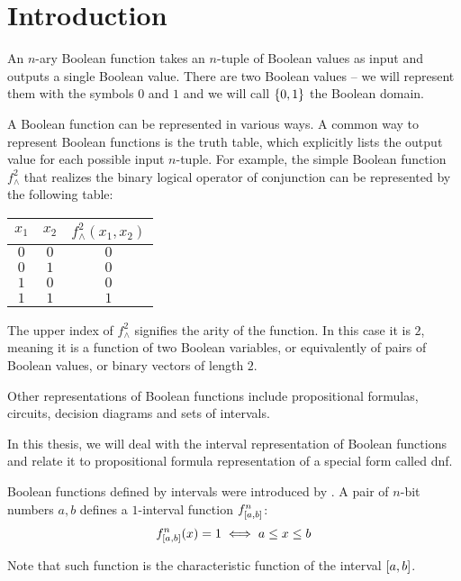 \chapter*{Introduction}

An $n$-ary Boolean function takes an $n$-tuple of Boolean values as input
and outputs a single Boolean value.
There are two Boolean values
-- we will represent them with the symbols $0$ and $1$
and we will call $\{0, 1\}$ the Boolean domain.

A Boolean function can be represented in various ways.
A common way to represent Boolean functions
is the truth table,
which explicitly lists the output value for each possible input $n$-tuple.
For example,
the simple Boolean function $f^2_{\wedge}$ that realizes the binary logical operator of conjunction
can be represented by the following table:
\begin{center}
\begin{tabular}{cc|c}
$x_1$ & $x_2$ & $f^2_{\wedge}(x_1, x_2)$ \\
\hline
$0$ & $0$ & $0$ \\
$0$ & $1$ & $0$ \\
$1$ & $0$ & $0$ \\
$1$ & $1$ & $1$ \\
\end{tabular}
\end{center}

The upper index of $f^2_{\wedge}$
signifies the arity of the function.
In this case it is $2$,
meaning it is a function of two Boolean variables,
or equivalently of pairs of Boolean values,
or binary vectors of length $2$.

Other representations of Boolean functions
include
propositional formulas,
circuits,
decision diagrams
and sets of intervals.

In this thesis,
we will deal with the interval representation of Boolean functions
and relate it to propositional formula representation of a special form called \acrlong{dnf}.

Boolean functions defined by intervals were introduced
by \citet{Schieber2005154}.
A pair of $n$-bit numbers $a, b$
defines a $1$-interval function
$f^{n}_{[a, b]}$:
$$
f^{n}_{[a, b]} (x) = 1
\iff a \leq x \leq b
$$

Note that such function
is the characteristic function of the interval
$[a, b]$.

